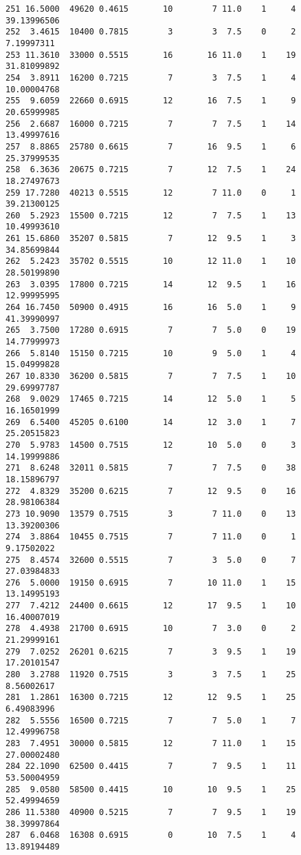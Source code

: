 \documentclass[
  letterpaper,
  DIV=11,
  numbers=noendperiod]{scrreprt}
\begin{document}
\begin{verbatim}
251 16.5000  49620 0.4615       10        7 11.0    1     4 39.13996506
252  3.4615  10400 0.7815        3        3  7.5    0     2  7.19997311
253 11.3610  33000 0.5515       16       16 11.0    1    19 31.81099892
254  3.8911  16200 0.7215        7        3  7.5    1     4 10.00004768
255  9.6059  22660 0.6915       12       16  7.5    1     9 20.65999985
256  2.6687  16000 0.7215        7        7  7.5    1    14 13.49997616
257  8.8865  25780 0.6615        7       16  9.5    1     6 25.37999535
258  6.3636  20675 0.7215        7       12  7.5    1    24 18.27497673
259 17.7280  40213 0.5515       12        7 11.0    0     1 39.21300125
260  5.2923  15500 0.7215       12        7  7.5    1    13 10.49993610
261 15.6860  35207 0.5815        7       12  9.5    1     3 34.85699844
262  5.2423  35702 0.5515       10       12 11.0    1    10 28.50199890
263  3.0395  17800 0.7215       14       12  9.5    1    16 12.99995995
264 16.7450  50900 0.4915       16       16  5.0    1     9 41.39990997
265  3.7500  17280 0.6915        7        7  5.0    0    19 14.77999973
266  5.8140  15150 0.7215       10        9  5.0    1     4 15.04999828
267 10.8330  36200 0.5815        7        7  7.5    1    10 29.69997787
268  9.0029  17465 0.7215       14       12  5.0    1     5 16.16501999
269  6.5400  45205 0.6100       14       12  3.0    1     7 25.20515823
270  5.9783  14500 0.7515       12       10  5.0    0     3 14.19999886
271  8.6248  32011 0.5815        7        7  7.5    0    38 18.15896797
272  4.8329  35200 0.6215        7       12  9.5    0    16 28.98106384
273 10.9090  13579 0.7515        3        7 11.0    0    13 13.39200306
274  3.8864  10455 0.7515        7        7 11.0    0     1  9.17502022
275  8.4574  32600 0.5515        7        3  5.0    0     7 27.03984833
276  5.0000  19150 0.6915        7       10 11.0    1    15 13.14995193
277  7.4212  24400 0.6615       12       17  9.5    1    10 16.40007019
278  4.4938  21700 0.6915       10        7  3.0    0     2 21.29999161
279  7.0252  26201 0.6215        7        3  9.5    1    19 17.20101547
280  3.2788  11920 0.7515        3        3  7.5    1    25  8.56002617
281  1.2861  16300 0.7215       12       12  9.5    1    25  6.49083996
282  5.5556  16500 0.7215        7        7  5.0    1     7 12.49996758
283  7.4951  30000 0.5815       12        7 11.0    1    15 27.00002480
284 22.1090  62500 0.4415        7        7  9.5    1    11 53.50004959
285  9.0580  58500 0.4415       10       10  9.5    1    25 52.49994659
286 11.5380  40900 0.5215        7        7  9.5    1    19 38.39997864
287  6.0468  16308 0.6915        0       10  7.5    1     4 13.89194489

\end{verbatim}
\end{document}
